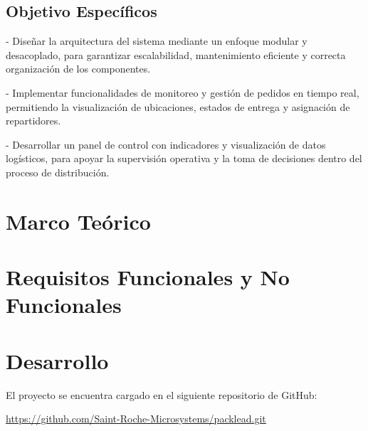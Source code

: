 \documentclass[11pt,letterpaper]{article}
\begin{document}
\subsection{Objetivo Específicos}
- Diseñar la arquitectura del sistema mediante un enfoque modular y desacoplado, para garantizar escalabilidad, mantenimiento eficiente y correcta organización de los componentes.

- Implementar funcionalidades de monitoreo y gestión de pedidos en tiempo real, permitiendo la visualización de ubicaciones, estados de entrega y asignación de repartidores.

- Desarrollar un panel de control con indicadores y visualización de datos logísticos, para apoyar la supervisión operativa y la toma de decisiones dentro del proceso de distribución.


\section{Marco Teórico}


\section{Requisitos Funcionales y No Funcionales}



\section{Desarrollo}

El proyecto se encuentra cargado en el siguiente repositorio de GitHub: 

\href{https://github.com/Saint-Roche-Microsystems/packlead.git}{\color{blue}\underline{https://github.com/Saint-Roche-Microsystems/packlead.git}}
\end{document}
